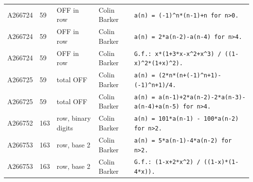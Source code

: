 \documentclass[11pt]{article}
\theoremstyle{definition}
\theoremstyle{remark}
\begin{document}
{\begin{longtable}{p{1.3cm}p{0.7cm}p{2.4cm}p{2.3cm}p{7.3cm}}
A266724 & 59 & OFF in row & Colin Barker & \texttt{a(n)\allowbreak{} \allowbreak{}=\allowbreak{} \allowbreak{}(-\allowbreak{}1)\allowbreak{}\^{}n*\allowbreak{}(n-\allowbreak{}1)\allowbreak{}+\allowbreak{}n \allowbreak{}for \allowbreak{}n>0.} \\
A266724 & 59 & OFF in row & Colin Barker & \texttt{a(n)\allowbreak{} \allowbreak{}=\allowbreak{} \allowbreak{}2*\allowbreak{}a(n-\allowbreak{}2)\allowbreak{}-\allowbreak{}a(n-\allowbreak{}4)\allowbreak{} \allowbreak{}for \allowbreak{}n>4.} \\
A266724 & 59 & OFF in row & Colin Barker & \texttt{G.f.: \allowbreak{}x*\allowbreak{}(1+\allowbreak{}3*\allowbreak{}x-\allowbreak{}x\^{}2+\allowbreak{}x\^{}3)\allowbreak{} \allowbreak{}/\allowbreak{} \allowbreak{}((1-\allowbreak{}x)\allowbreak{}\^{}2*\allowbreak{}(1+\allowbreak{}x)\allowbreak{}\^{}2)\allowbreak{}.} \\
A266725 & 59 & total OFF & Colin Barker & \texttt{a(n)\allowbreak{} \allowbreak{}=\allowbreak{} \allowbreak{}(2*\allowbreak{}n*\allowbreak{}(n+\allowbreak{}(-\allowbreak{}1)\allowbreak{}\^{}n+\allowbreak{}1)\allowbreak{}-\allowbreak{}(-\allowbreak{}1)\allowbreak{}\^{}n+\allowbreak{}1)\allowbreak{}/\allowbreak{}4.} \\
A266725 & 59 & total OFF & Colin Barker & \texttt{a(n)\allowbreak{} \allowbreak{}=\allowbreak{} \allowbreak{}a(n-\allowbreak{}1)\allowbreak{}+\allowbreak{}2*\allowbreak{}a(n-\allowbreak{}2)\allowbreak{}-\allowbreak{}2*\allowbreak{}a(n-\allowbreak{}3)\allowbreak{}-\allowbreak{}a(n-\allowbreak{}4)\allowbreak{}+\allowbreak{}a(n-\allowbreak{}5)\allowbreak{} \allowbreak{}for \allowbreak{}n>4.} \\
A266752 & 163 & row, binary digits & Colin Barker & \texttt{a(n)\allowbreak{} \allowbreak{}=\allowbreak{} \allowbreak{}101*\allowbreak{}a(n-\allowbreak{}1)\allowbreak{} \allowbreak{}-\allowbreak{} \allowbreak{}100*\allowbreak{}a(n-\allowbreak{}2)\allowbreak{} \allowbreak{}for \allowbreak{}n>2.} \\
A266753 & 163 & row, base 2 & Colin Barker & \texttt{a(n)\allowbreak{} \allowbreak{}=\allowbreak{} \allowbreak{}5*\allowbreak{}a(n-\allowbreak{}1)\allowbreak{}-\allowbreak{}4*\allowbreak{}a(n-\allowbreak{}2)\allowbreak{} \allowbreak{}for \allowbreak{}n>2.} \\
A266753 & 163 & row, base 2 & Colin Barker & \texttt{G.f.: \allowbreak{}(1-\allowbreak{}x+\allowbreak{}2*\allowbreak{}x\^{}2)\allowbreak{} \allowbreak{}/\allowbreak{} \allowbreak{}((1-\allowbreak{}x)\allowbreak{}*\allowbreak{}(1-\allowbreak{}4*\allowbreak{}x)\allowbreak{})\allowbreak{}.} \\

\end{longtable}}
\end{document}
